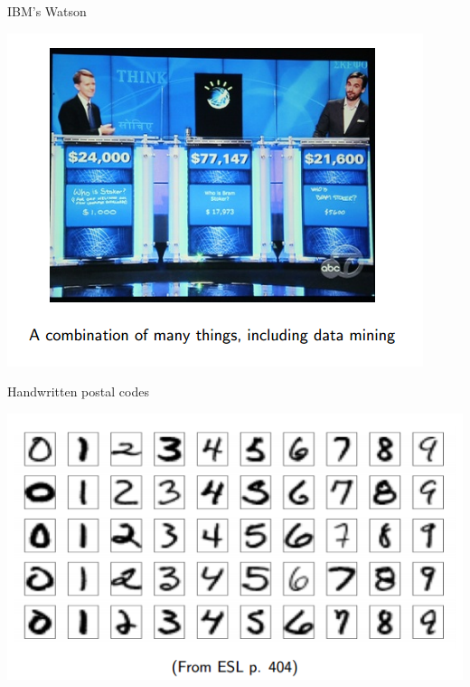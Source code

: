\documentclass{beamer}
\begin{document}
\begin{frame}{IBM's Watson}
    \begin{center}
        \includegraphics[scale=0.5]{watson.png}
    \end{center}
\end{frame}
\begin{frame}{Handwritten postal codes}
    \begin{center}
        \includegraphics[scale=0.5]{ocr.png}
    \end{center}
\end{frame}
\end{document}
